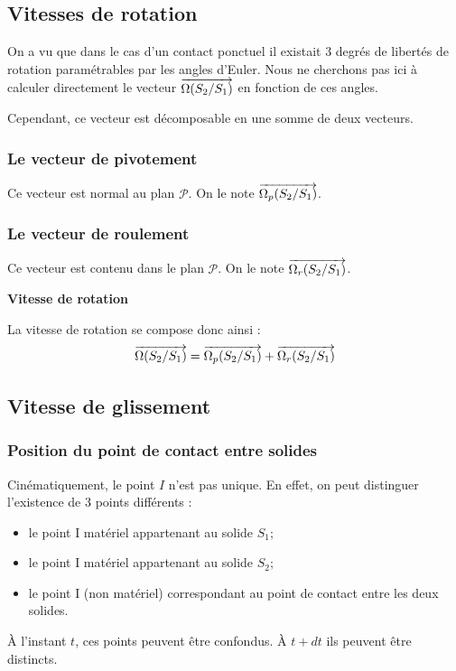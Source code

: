 \documentclass[11pt,oneside]{article}
\begin{document}
\subsection{Vitesses de rotation}
On a vu que dans le cas d'un contact ponctuel il existait 3 degrés de libertés de rotation paramétrables par les angles d'Euler. Nous ne cherchons pas ici à calculer directement le vecteur $\overrightarrow{\Omega(S_2/S_1)}$ en fonction de ces angles.

Cependant, ce vecteur est décomposable en une somme de deux vecteurs.
\subsubsection*{Le vecteur de pivotement}
Ce vecteur est normal au plan $\mathcal{P}$. On le note $\overrightarrow{\Omega_p(S_2/S_1)}$.

\subsubsection*{Le vecteur de roulement}
Ce vecteur est contenu dans le plan $\mathcal{P}$. On le note $\overrightarrow{\Omega_r(S_2/S_1)}$.


\begin{resultat}
\textbf{Vitesse de rotation}

La vitesse de rotation se compose donc ainsi :
$$\overrightarrow{\Omega(S_2/S_1)} = \overrightarrow{\Omega_p(S_2/S_1)} + \overrightarrow{\Omega_r(S_2/S_1)}$$
\end{resultat}



\subsection{Vitesse de glissement}
\subsubsection{Position du point de contact entre solides}
Cinématiquement, le point $I$ n'est pas unique. En effet, on peut distinguer l'existence de 3 points différents :
\begin{itemize}
\item le point I matériel appartenant au solide $S_1$;
\item le point I matériel appartenant au solide $S_2$;
\item le point I (non matériel) correspondant au point de contact entre les deux solides.
\end{itemize}

À l'instant $t$, ces points peuvent être confondus. À $t+dt$ ils peuvent être distincts.
\end{document}

